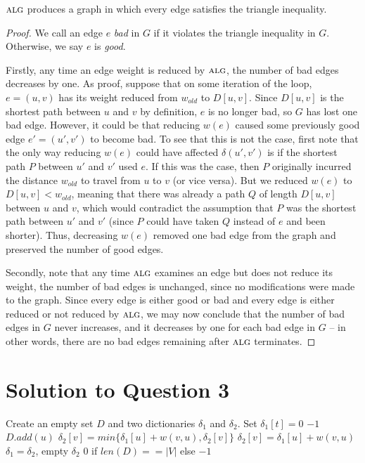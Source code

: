 \documentclass[11pt]{article}
\newcommand{\alg}{\textsc{alg}}
\begin{document}
 $\alg$ produces a graph in which every edge satisfies the triangle inequality.
\begin{proof}
  We call an edge $e$ {\em bad\/} in $G$ if it violates the triangle inequality in $G$.
  Otherwise, we say $e$ is {\em good}.

  Firstly, any time an edge weight is reduced by $\alg$, the number of bad edges decreases by one.
  As proof, suppose that on some iteration of the loop, $e = (u, v)$ has its weight reduced from $w_{old}$ to $D[u, v]$.
  Since $D[u, v]$ is the shortest path between $u$ and $v$ by definition, $e$ is no longer bad, so $G$ has lost one bad edge.
  However, it could be that reducing $w(e)$ caused some previously good edge $e' = (u', v')$ to become bad.
  To see that this is not the case, first note that the only way reducing $w(e)$ could have affected $\delta(u', v')$ is if the shortest path $P$ between $u'$ and $v'$ used $e$.
  If this was the case, then $P$ originally incurred the distance $w_{old}$ to travel from $u$ to $v$ (or vice versa).
  But we reduced $w(e)$ to $D[u, v] < w_{old}$, meaning that there was already a path $Q$ of length $D[u, v]$ between $u$ and $v$, which would contradict the assumption that $P$ was the shortest path between $u'$ and $v'$ (since $P$ could have taken $Q$ instead of $e$ and been shorter).
  Thus, decreasing $w(e)$ removed one bad edge from the graph and preserved the number of good edges.

  Secondly, note that any time $\alg$ examines an edge but does not reduce its weight, the number of bad edges is unchanged, since no modifications were made to the graph.
  Since every edge is either good or bad and every edge is either reduced or not reduced by $\alg$, we may now conclude that the number of bad edges in $G$ never increases, and it decreases by one for each bad edge in $G$ -- in other words, there are no bad edges remaining after $\alg$ terminates.
\end{proof}

\newpage
\section{Solution to Question 3}


\begin{algorithm}
	\begin{algorithmic}
		\State Create an empty set $D$ and two dictionaries $\delta_1$ and $\delta_2$. Set $\delta_1[t] = 0$
				\State \Return $-1$
				\State $D.add(u)$
			\EndIf
					\State $\delta_2[v] = min\{\delta_1[u] + w(v, u), \delta_2[v]\}$
				\Else
					\State $\delta_2[v] = \delta_1[u] + w(v, u)$
				\EndIf
			\EndFor
				\State $\delta_1 = \delta_2$, empty $\delta_2$
			\EndIf
		\EndFor
		\State \Return $0$ if $len(D) == |V|$ else $-1$
	\end{algorithmic}
\end{algorithm}
\end{document}
